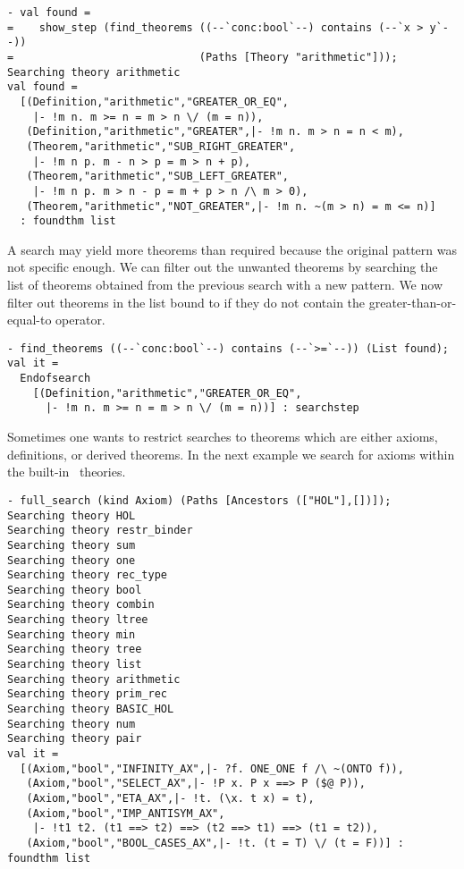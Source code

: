 \begin{session}\begin{verbatim}
- val found =
=    show_step (find_theorems ((--`conc:bool`--) contains (--`x > y`--))
=                             (Paths [Theory "arithmetic"]));
Searching theory arithmetic
val found =
  [(Definition,"arithmetic","GREATER_OR_EQ",
    |- !m n. m >= n = m > n \/ (m = n)),
   (Definition,"arithmetic","GREATER",|- !m n. m > n = n < m),
   (Theorem,"arithmetic","SUB_RIGHT_GREATER",
    |- !m n p. m - n > p = m > n + p),
   (Theorem,"arithmetic","SUB_LEFT_GREATER",
    |- !m n p. m > n - p = m + p > n /\ m > 0),
   (Theorem,"arithmetic","NOT_GREATER",|- !m n. ~(m > n) = m <= n)]
  : foundthm list
\end{verbatim}\end{session}

A search may yield more theorems than required because the original pattern
was not specific enough. We can filter out the unwanted theorems by searching
the list of theorems obtained from the previous search with a new pattern.
We now filter out theorems in the list bound to  if they do not
contain the greater-than-or-equal-to operator.

\begin{session}\begin{verbatim}
- find_theorems ((--`conc:bool`--) contains (--`>=`--)) (List found);
val it =
  Endofsearch
    [(Definition,"arithmetic","GREATER_OR_EQ",
      |- !m n. m >= n = m > n \/ (m = n))] : searchstep
\end{verbatim}\end{session}

Sometimes one wants to restrict searches to theorems which are either axioms,
definitions, or derived theorems. In the next example we search for axioms
within the built-in \HOL\ theories.

\begin{session}\begin{verbatim}
- full_search (kind Axiom) (Paths [Ancestors (["HOL"],[])]);
Searching theory HOL
Searching theory restr_binder
Searching theory sum
Searching theory one
Searching theory rec_type
Searching theory bool
Searching theory combin
Searching theory ltree
Searching theory min
Searching theory tree
Searching theory list
Searching theory arithmetic
Searching theory prim_rec
Searching theory BASIC_HOL
Searching theory num
Searching theory pair
val it =
  [(Axiom,"bool","INFINITY_AX",|- ?f. ONE_ONE f /\ ~(ONTO f)),
   (Axiom,"bool","SELECT_AX",|- !P x. P x ==> P ($@ P)),
   (Axiom,"bool","ETA_AX",|- !t. (\x. t x) = t),
   (Axiom,"bool","IMP_ANTISYM_AX",
    |- !t1 t2. (t1 ==> t2) ==> (t2 ==> t1) ==> (t1 = t2)),
   (Axiom,"bool","BOOL_CASES_AX",|- !t. (t = T) \/ (t = F))] : foundthm list
\end{verbatim}\end{session}

